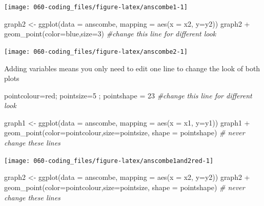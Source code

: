 \documentclass[
]{book}
\newenvironment{Shaded}{\begin{snugshade}}{\end{snugshade}}
\newcommand{\AttributeTok}[1]{\textcolor[rgb]{0.77,0.63,0.00}{#1}}
\newcommand{\CommentTok}[1]{\textcolor[rgb]{0.56,0.35,0.01}{\textit{#1}}}
\newcommand{\DecValTok}[1]{\textcolor[rgb]{0.00,0.00,0.81}{#1}}
\newcommand{\FunctionTok}[1]{\textcolor[rgb]{0.00,0.00,0.00}{#1}}
\newcommand{\NormalTok}[1]{#1}
\newcommand{\OtherTok}[1]{\textcolor[rgb]{0.56,0.35,0.01}{#1}}
\newcommand{\SpecialCharTok}[1]{\textcolor[rgb]{0.00,0.00,0.00}{#1}}
\newcommand{\StringTok}[1]{\textcolor[rgb]{0.31,0.60,0.02}{#1}}
\begin{document}
\begin{center}\texttt{[image: 060-coding\_files/figure-latex/anscombe1-1]} \end{center}

\begin{Shaded}
\begin{Highlighting}[]
\NormalTok{graph2 }\OtherTok{\textless{}{-}} \FunctionTok{ggplot}\NormalTok{(}\AttributeTok{data =}\NormalTok{ anscombe, }\AttributeTok{mapping =} \FunctionTok{aes}\NormalTok{(}\AttributeTok{x =}\NormalTok{ x2, }\AttributeTok{y=}\NormalTok{y2))}
\NormalTok{graph2 }\SpecialCharTok{+} \FunctionTok{geom\_point}\NormalTok{(}\AttributeTok{color=}\StringTok{\textquotesingle{}blue\textquotesingle{}}\NormalTok{,}\AttributeTok{size=}\DecValTok{3}\NormalTok{) }\CommentTok{\#change this line for different look}
\end{Highlighting}
\end{Shaded}

\begin{center}\texttt{[image: 060-coding\_files/figure-latex/anscombe2-1]} \end{center}

Adding variables means you only need to edit one line to change the look of both plots

\begin{Shaded}
\begin{Highlighting}[]
\NormalTok{pointcolour}\OtherTok{=}\StringTok{\textquotesingle{}red\textquotesingle{}}\NormalTok{; pointsize}\OtherTok{=}\DecValTok{5}\NormalTok{ ; pointshape }\OtherTok{=} \DecValTok{23} \CommentTok{\#change this line for different look}

\NormalTok{graph1 }\OtherTok{\textless{}{-}} \FunctionTok{ggplot}\NormalTok{(}\AttributeTok{data =}\NormalTok{ anscombe, }\AttributeTok{mapping =} \FunctionTok{aes}\NormalTok{(}\AttributeTok{x =}\NormalTok{ x1, }\AttributeTok{y=}\NormalTok{y1)) }
\NormalTok{graph1 }\SpecialCharTok{+} \FunctionTok{geom\_point}\NormalTok{(}\AttributeTok{color=}\NormalTok{pointcolour,}\AttributeTok{size=}\NormalTok{pointsize, }\AttributeTok{shape =}\NormalTok{ pointshape) }\CommentTok{\# never change these lines}
\end{Highlighting}
\end{Shaded}

\begin{center}\texttt{[image: 060-coding\_files/figure-latex/anscombe1and2red-1]} \end{center}

\begin{Shaded}
\begin{Highlighting}[]
\NormalTok{graph2 }\OtherTok{\textless{}{-}} \FunctionTok{ggplot}\NormalTok{(}\AttributeTok{data =}\NormalTok{ anscombe, }\AttributeTok{mapping =} \FunctionTok{aes}\NormalTok{(}\AttributeTok{x =}\NormalTok{ x2, }\AttributeTok{y=}\NormalTok{y2))}
\NormalTok{graph2 }\SpecialCharTok{+} \FunctionTok{geom\_point}\NormalTok{(}\AttributeTok{color=}\NormalTok{pointcolour,}\AttributeTok{size=}\NormalTok{pointsize, }\AttributeTok{shape =}\NormalTok{ pointshape) }\CommentTok{\# never change these lines}
\end{Highlighting}
\end{Shaded}
\end{document}
